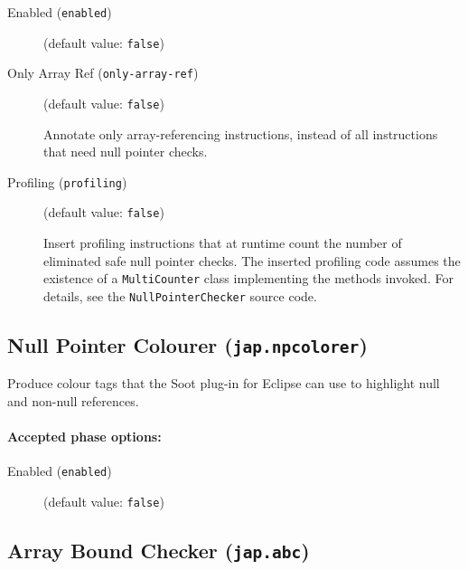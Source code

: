 \documentclass{article}
\begin{document}
\begin{description}

\item[Enabled ({\tt enabled})]
(default value: {\tt false})






\item[Only Array Ref ({\tt only-array-ref})]
(default value: {\tt false})




Annotate only array-referencing instructions, instead of all
instructions that need null pointer checks.



\item[Profiling ({\tt profiling})]
(default value: {\tt false})





\par

Insert profiling instructions that at runtime count the number of
eliminated safe null pointer checks. The inserted profiling code
assumes the existence of a {\tt MultiCounter} class
implementing the methods invoked. For details, see the
{\tt NullPointerChecker} source code.



\end{description}

\subsection{Null Pointer Colourer ({\tt jap.npcolorer})}

Produce colour tags that the Soot plug-in for Eclipse can use to
highlight null and non-null references.


\paragraph{Accepted phase options:} 

\begin{description}

\item[Enabled ({\tt enabled})]
(default value: {\tt false})






\end{description}

\subsection{Array Bound Checker ({\tt jap.abc})}
\end{document}
